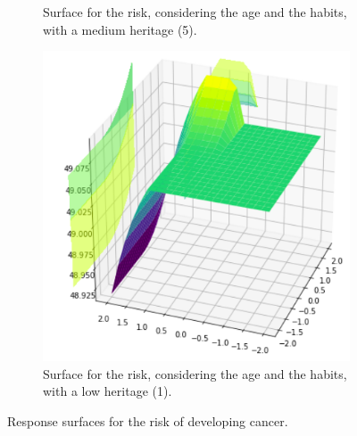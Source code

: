\begin{figure}[ht]
\begin{subfigure}{.3\textwidth}
  \caption{Surface for the risk, considering the age and the habits, with a medium heritage (5).}
  \label{fig:sur8}
\end{subfigure}
\hspace{10pts}
\begin{subfigure}{.3\textwidth}
  \centering
  \includegraphics[width=.8\linewidth]{figures/surfaces/age-habits1.png} 
  \caption{Surface for the risk, considering the age and the habits, with a low heritage (1).}
  \label{fig:sur9}
\end{subfigure}
\caption{Response surfaces for the risk of developing cancer.}
\label{fig:surfaces}
\end{figure}